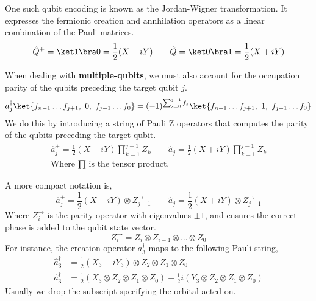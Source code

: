 One such qubit encoding is known as the Jordan-Wigner transformation. It expresses the fermionic creation and annhilation operators as a linear combination of the Pauli matrices.
\begin{equation*}
    \hat Q^+ = \ket 1 \bra 0 = \frac{1}{2} (X - iY) \qquad \hat Q = \ket 0 \bra 1 = \frac{1}{2} (X + iY) 
\end{equation*}

When dealing with \textbf{multiple-qubits}, we must also account for the occupation parity of the qubits preceding the target qubit $j$.
\begin{equation*}
    a_j^\dagger \ket{f_{n-1} \dots f_{j+1},\,\, 0,\,\, f_{j-1} \dots f_0} = (-1)^{\sum_{s=0}^{j-1} f_s} \ket{f_{n-1} \dots f_{j+1},\,\, 1,\,\, f_{j-1} \dots f_0}
\end{equation*}
We do this by introducing a string of Pauli Z operators that computes the parity of the qubits preceding the target qubit.
\begin{equation*}
\begin{gathered}
    \hat a_j^+ = \frac{1}{2} (X - iY) \prod_{k=1}^{j-1} Z_k \qquad
    \hat a_j = \frac{1}{2} (X + iY) \prod_{k=1}^{j-1} Z_k \\[2ex]
    \text{Where $\prod$ is the tensor product.}
\end{gathered}
\end{equation*}

A more compact notation is,
\begin{equation*}
    \hat a_j^+ = \frac{1}{2} (X - iY) \otimes Z^\rightarrow_{j-1} \qquad
    \hat a_j = \frac{1}{2} (X + iY) \otimes Z^\rightarrow_{j-1}
\end{equation*}
Where $Z^\rightarrow_{i}$ is the parity operator with eigenvalues $\pm 1$, and ensures the correct phase is added to the qubit state vector.
\begin{equation*}
    Z^\rightarrow_{i} = Z_i \otimes Z_{i-1} \otimes \dots \otimes Z_0
\end{equation*}
For instance, the creation operator $a^\dagger_3$ maps to the following Pauli string,
\begin{align*}
    \hat a_3^\dagger &=
    \frac{1}{2} (X_3 - iY_3) \otimes Z_2 \otimes Z_1 \otimes Z_0 \\
    \hat a_3^\dagger &=
    \frac{1}{2} ( X_3 \otimes Z_2 \otimes Z_1 \otimes Z_0 ) -
    \frac{1}{2} i ( Y_3 \otimes Z_2 \otimes Z_1 \otimes Z_0 )
\end{align*}
Usually we drop the subscript specifying the orbital acted on.

